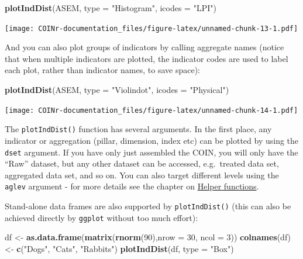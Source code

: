 \documentclass[
]{book}
\newenvironment{Shaded}{\begin{snugshade}}{\end{snugshade}}
\newcommand{\DataTypeTok}[1]{\textcolor[rgb]{0.13,0.29,0.53}{#1}}
\newcommand{\DecValTok}[1]{\textcolor[rgb]{0.00,0.00,0.81}{#1}}
\newcommand{\KeywordTok}[1]{\textcolor[rgb]{0.13,0.29,0.53}{\textbf{#1}}}
\newcommand{\NormalTok}[1]{#1}
\newcommand{\StringTok}[1]{\textcolor[rgb]{0.31,0.60,0.02}{#1}}
\begin{document}
\begin{Shaded}
\begin{Highlighting}[]
\KeywordTok{plotIndDist}\NormalTok{(ASEM, }\DataTypeTok{type =} \StringTok{"Histogram"}\NormalTok{, }\DataTypeTok{icodes =} \StringTok{"LPI"}\NormalTok{)}
\end{Highlighting}
\end{Shaded}

\texttt{[image: COINr-documentation\_files/figure-latex/unnamed-chunk-13-1.pdf]}

And you can also plot groups of indicators by calling aggregate names (notice that when multiple indicators are plotted, the indicator codes are used to label each plot, rather than indicator names, to save space):

\begin{Shaded}
\begin{Highlighting}[]
\KeywordTok{plotIndDist}\NormalTok{(ASEM, }\DataTypeTok{type =} \StringTok{"Violindot"}\NormalTok{, }\DataTypeTok{icodes =} \StringTok{"Physical"}\NormalTok{)}
\end{Highlighting}
\end{Shaded}

\texttt{[image: COINr-documentation\_files/figure-latex/unnamed-chunk-14-1.pdf]}

The \texttt{plotIndDist()} function has several arguments. In the first place, any indicator or aggregation (pillar, dimension, index etc) can be plotted by using the \texttt{dset} argument. If you have only just assembled the COIN, you will only have the ``Raw'' dataset, but any other dataset can be accessed, e.g.~treated data set, aggregated data set, and so on. You can also target different levels using the \texttt{aglev} argument - for more details see the chapter on \protect\hyperlink{helper-functions}{Helper functions}.

Stand-alone data frames are also supported by \texttt{plotIndDist()} (this can also be achieved directly by \texttt{ggplot} without too much effort):

\begin{Shaded}
\begin{Highlighting}[]
\NormalTok{df <-}\StringTok{ }\KeywordTok{as.data.frame}\NormalTok{(}\KeywordTok{matrix}\NormalTok{(}\KeywordTok{rnorm}\NormalTok{(}\DecValTok{90}\NormalTok{),}\DataTypeTok{nrow =} \DecValTok{30}\NormalTok{, }\DataTypeTok{ncol =} \DecValTok{3}\NormalTok{))}
\KeywordTok{colnames}\NormalTok{(df) <-}\StringTok{ }\KeywordTok{c}\NormalTok{(}\StringTok{"Dogs"}\NormalTok{, }\StringTok{"Cats"}\NormalTok{, }\StringTok{"Rabbits"}\NormalTok{)}
\KeywordTok{plotIndDist}\NormalTok{(df, }\DataTypeTok{type =} \StringTok{"Box"}\NormalTok{)}
\end{Highlighting}
\end{Shaded}
\end{document}
